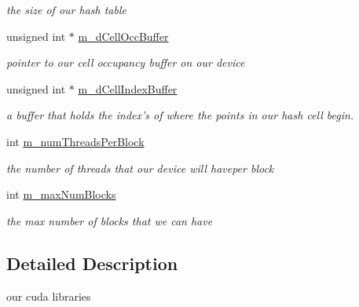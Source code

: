 \begin{DoxyCompactItemize}
\begin{DoxyCompactList}\small\item\em the size of our hash table \end{DoxyCompactList}\item 
\hypertarget{class_s_p_h_engine_a14d0c9cc89000c1f1159f29e451bd769}{unsigned int $\ast$ \hyperlink{class_s_p_h_engine_a14d0c9cc89000c1f1159f29e451bd769}{m\-\_\-d\-Cell\-Occ\-Buffer}}\label{class_s_p_h_engine_a14d0c9cc89000c1f1159f29e451bd769}

\begin{DoxyCompactList}\small\item\em pointer to our cell occupancy buffer on our device \end{DoxyCompactList}\item 
\hypertarget{class_s_p_h_engine_a7331c8fe13df74d92acc3800b7b5b00c}{unsigned int $\ast$ \hyperlink{class_s_p_h_engine_a7331c8fe13df74d92acc3800b7b5b00c}{m\-\_\-d\-Cell\-Index\-Buffer}}\label{class_s_p_h_engine_a7331c8fe13df74d92acc3800b7b5b00c}

\begin{DoxyCompactList}\small\item\em a buffer that holds the index's of where the points in our hash cell begin. \end{DoxyCompactList}\item 
\hypertarget{class_s_p_h_engine_a06cf7d9593592386dcf87f83e9689dc6}{int \hyperlink{class_s_p_h_engine_a06cf7d9593592386dcf87f83e9689dc6}{m\-\_\-num\-Threads\-Per\-Block}}\label{class_s_p_h_engine_a06cf7d9593592386dcf87f83e9689dc6}

\begin{DoxyCompactList}\small\item\em the number of threads that our device will haveper block \end{DoxyCompactList}\item 
\hypertarget{class_s_p_h_engine_a691da6a3ddfee175915f4360ad53c080}{int \hyperlink{class_s_p_h_engine_a691da6a3ddfee175915f4360ad53c080}{m\-\_\-max\-Num\-Blocks}}\label{class_s_p_h_engine_a691da6a3ddfee175915f4360ad53c080}

\begin{DoxyCompactList}\small\item\em the max number of blocks that we can have \end{DoxyCompactList}\end{DoxyCompactItemize}


\subsection{Detailed Description}
our cuda libraries 

